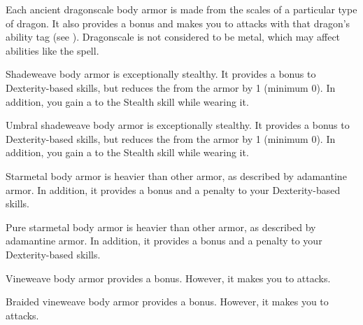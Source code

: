        Each ancient dragonscale body armor is made from the scales of a particular type of dragon.
      It also provides a   bonus and makes you  to attacks with that dragon's ability tag (see ).
      Dragonscale is not considered to be metal, which may affect abilities like the  spell.

       Shadeweave body armor is exceptionally stealthy.
      It provides a  bonus to Dexterity-based skills, but reduces the  from the armor by 1 (minimum 0).
      In addition, you gain a   to the Stealth skill while wearing it.

       Umbral shadeweave body armor is exceptionally stealthy.
      It provides a  bonus to Dexterity-based skills, but reduces the  from the armor by 1 (minimum 0).
      In addition, you gain a   to the Stealth skill while wearing it.

       Starmetal body armor is heavier than other armor, as described by adamantine armor.
      In addition, it provides a   bonus and a  penalty to your Dexterity-based skills.

       Pure starmetal body armor is heavier than other armor, as described by adamantine armor.
      In addition, it provides a   bonus and a  penalty to your Dexterity-based skills.

       Vineweave body armor provides a   bonus.
      However, it makes you \vulnerable to \atFire attacks.

       Braided vineweave body armor provides a   bonus.
      However, it makes you \vulnerable to \atFire attacks.

